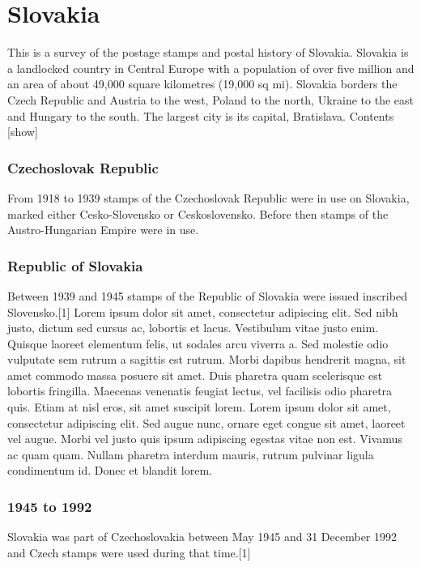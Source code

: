 \chapter{Slovakia}


This is a survey of the postage stamps and postal history of Slovakia.
Slovakia is a landlocked country in Central Europe with a population of over five million and an area of about 49,000 square kilometres (19,000 sq mi). Slovakia borders the Czech Republic and Austria to the west, Poland to the north, Ukraine to the east and Hungary to the south. The largest city is its capital, Bratislava.
Contents  [show]
 
\subsection{Czechoslovak Republic}

From 1918 to 1939 stamps of the Czechoslovak Republic were in use on Slovakia, marked either Cesko-Slovensko or Ceskoslovensko. Before then stamps of the Austro-Hungarian Empire were in use.

\subsection{Republic of Slovakia}

Between 1939 and 1945 stamps of the Republic of Slovakia were issued inscribed Slovensko.[1] Lorem ipsum dolor sit amet, consectetur adipiscing elit. Sed nibh justo, dictum sed cursus ac, lobortis et lacus. Vestibulum vitae justo enim. Quisque laoreet elementum felis, ut sodales arcu viverra a. Sed molestie odio vulputate sem rutrum a sagittis est rutrum. Morbi dapibus hendrerit magna, sit amet commodo massa posuere sit amet. Duis pharetra quam scelerisque est lobortis fringilla. Maecenas venenatis feugiat lectus, vel facilisis odio pharetra quis. Etiam at nisl eros, sit amet suscipit lorem. Lorem ipsum dolor sit amet, consectetur adipiscing elit. Sed augue nunc, ornare eget congue sit amet, laoreet vel augue. Morbi vel justo quis ipsum adipiscing egestas vitae non est. Vivamus ac quam quam. Nullam pharetra
                                                    interdum mauris, rutrum pulvinar ligula condimentum id. Donec et blandit lorem. 

\subsection{1945 to 1992}

Slovakia was part of Czechoslovakia between May 1945 and 31 December 1992 and Czech stamps were used during that time.[1]

